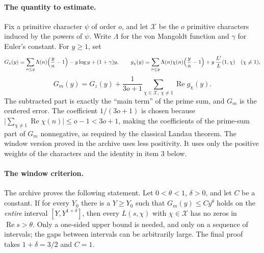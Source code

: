 \documentclass[11pt]{article}
\renewcommand{\Re}{\operatorname{Re}}
\begin{document}
\paragraph{The quantity to estimate.} Fix a primitive character $\psi$ of order $o$, and let $\mathcal X$ be the $o$ primitive characters induced by the powers of $\psi$. Write $\Lambda$ for the von Mangoldt function and $\gamma$ for Euler's constant. For $y\ge1$, set
\[
G_z(y)=\sum_{n\le y}\Lambda(n)\Bigl(\frac yn-1\Bigr)-y\log y+(1+\gamma)y,\qquad
g_\chi(y)=\sum_{n\le y}\Lambda(n)\chi(n)\Bigl(\frac yn-1\Bigr)+y\,\frac{L'}{L}(1,\chi)\quad(\chi\ne1),
\]
\[
G_m(y)=G_z(y)+\frac1{3o+1}\sum_{\chi\in\mathcal X,\ \chi\ne1}\Re g_\chi(y).
\]
The subtracted part is exactly the ``main term'' of the prime sum, and $G_m$ is the centered error. The coefficient $1/(3o+1)$ is chosen because $\bigl|\sum_{\chi\ne1}\Re\chi(n)\bigr|\le o-1<3o+1$, making the coefficients of the prime-sum part of $G_m$ nonnegative, as required by the classical Landau theorem. The window version proved in the archive uses less positivity. It uses only the positive weights of the characters and the identity in item 3 below.

\paragraph{The window criterion.} The archive proves the following statement. Let $0<\theta<1$, $\delta>0$, and let $C$ be a constant. If for every $Y_0$ there is a $Y\ge Y_0$ such that $G_m(y)\le Cy^\theta$ holds on the \emph{entire} interval $[Y,Y^{1+\delta}]$, then every $L(s,\chi)$ with $\chi\in\mathcal X$ has no zeros in $\Re s>\theta$. Only a one-sided upper bound is needed, and only on a sequence of intervals; the gaps between intervals can be arbitrarily large. The final proof takes $1+\delta=3/2$ and $C=1$.
\end{document}

